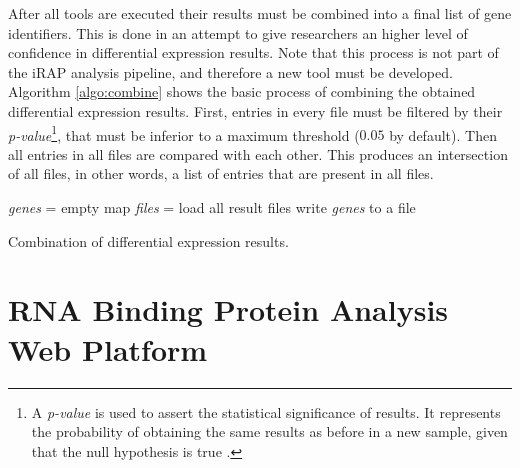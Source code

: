 After all tools are executed their results must be combined into a final list of
gene identifiers. This is done in an attempt to give researchers an higher level
of confidence in differential expression results. Note that this process is not
part of the iRAP analysis pipeline, and therefore a new tool must be developed.
Algorithm \ref{algo:combine} shows the basic process of combining the obtained
differential expression results. First, entries in every file must be filtered
by their \emph{p-value}\footnote{A \emph{p-value} is used to assert the
statistical significance of results. It represents the probability of obtaining
the same results as before in a new sample, given that the null hypothesis is
true \cite{goodman45dirty}.}, that must be inferior to a maximum threshold
($0.05$ by default). Then all entries in all files are compared with each other.
This produces an intersection of all files, in other words, a list of entries
that are present in all files.

\begin{algorithm}
  \emph{genes} = empty map\;
  \emph{files} = load all result files\;
  write \emph{genes} to a file\;
  \BlankLine

  \caption[Combination of differential expression results]{
    Combination of differential expression results.
  }
  \label{algo:combine}
\end{algorithm}

\section{RNA Binding Protein Analysis Web Platform}


